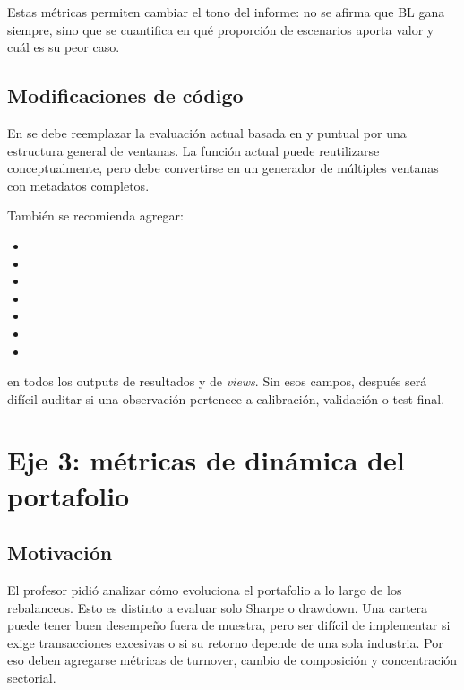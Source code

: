 \documentclass[11pt]{article}
\begin{document}
Estas m\'etricas permiten cambiar el tono del informe: no se afirma que BL gana siempre, sino que se cuantifica en qu\'e proporci\'on de escenarios aporta valor y cu\'al es su peor caso.

\subsection{Modificaciones de c\'odigo}

En  se debe reemplazar la evaluaci\'on actual basada en  y  puntual por una estructura general de ventanas. La funci\'on actual  puede reutilizarse conceptualmente, pero debe convertirse en un generador de m\'ultiples ventanas con metadatos completos.

Tambi\'en se recomienda agregar:

\begin{itemize}
    \item {}
    \item {}
    \item {}
    \item {}
    \item {}
    \item {}
    \item {}
\end{itemize}

en todos los outputs de resultados y de \textit{views}. Sin esos campos, despu\'es ser\'a dif\'icil auditar si una observaci\'on pertenece a calibraci\'on, validaci\'on o test final.

\section{Eje 3: m\'etricas de din\'amica del portafolio}

\subsection{Motivaci\'on}

El profesor pidi\'o analizar c\'omo evoluciona el portafolio a lo largo de los rebalanceos. Esto es distinto a evaluar solo Sharpe o drawdown. Una cartera puede tener buen desempe\~no fuera de muestra, pero ser dif\'icil de implementar si exige transacciones excesivas o si su retorno depende de una sola industria. Por eso deben agregarse m\'etricas de turnover, cambio de composici\'on y concentraci\'on sectorial.
\end{document}
